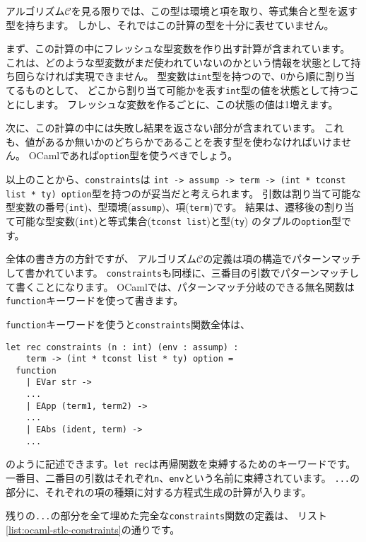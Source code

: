 アルゴリズム$\mathcal C$を見る限りでは、この型は環境と項を取り、等式集合と型を返す型を持ちます。
しかし、それではこの計算の型を十分に表せていません。

まず、この計算の中にフレッシュな型変数を作り出す計算が含まれています。
これは、どのような型変数がまだ使われていないのかという情報を状態として持ち回らなければ実現できません。
型変数は\texttt{int}型を持つので、0から順に割り当てるものとして、
どこから割り当て可能かを表す\texttt{int}型の値を状態として持つことにします。
フレッシュな変数を作るごとに、この状態の値は1増えます。

次に、この計算の中には失敗し結果を返さない部分が含まれています。
これも、値があるか無いかのどちらかであることを表す型を使わなければいけません。
OCamlであれば\texttt{option}型を使うべきでしょう。

以上のことから、\texttt{constraints}は
\texttt{int -> assump -> term -> (int * tconst list * ty) option}型を持つのが妥当だと考えられます。
引数は割り当て可能な型変数の番号(\texttt{int})、型環境(\texttt{assump})、項(\texttt{term})です。
結果は、遷移後の割り当て可能な型変数(\texttt{int})と等式集合(\texttt{tconst list})と型(\texttt{ty})
のタプルの\texttt{option}型です。

全体の書き方の方針ですが、
アルゴリズム$\mathcal C$の定義は項の構造でパターンマッチして書かれています。
\texttt{constraints}も同様に、三番目の引数でパターンマッチして書くことになります。
OCamlでは、パターンマッチ分岐のできる無名関数は\texttt{function}キーワードを使って書きます。

\texttt{function}キーワードを使うと\texttt{constraints}関数全体は、
\begin{lstlisting}
let rec constraints (n : int) (env : assump) :
    term -> (int * tconst list * ty) option =
  function
    | EVar str ->
    ...
    | EApp (term1, term2) ->
    ...
    | EAbs (ident, term) ->
    ...
\end{lstlisting}
のように記述できます。\texttt{let rec}は再帰関数を束縛するためのキーワードです。
一番目、二番目の引数はそれぞれ\texttt{n}、\texttt{env}という名前に束縛されています。
\texttt{...}の部分に、それぞれの項の種類に対する方程式生成の計算が入ります。

残りの\texttt{...}の部分を全て埋めた完全な\texttt{constraints}関数の定義は、
リスト\ref{list:ocaml-stlc-constraints}の通りです。

